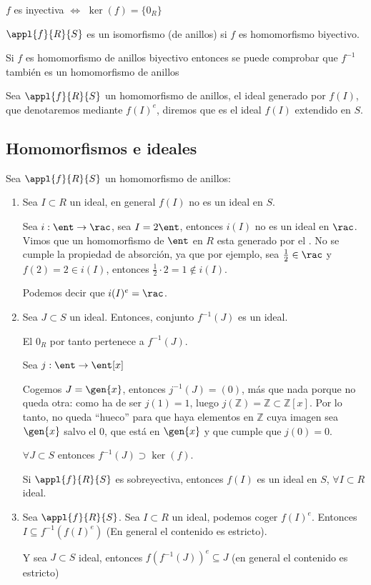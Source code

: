 \begin{prop}
	$f$ es inyectiva $\Leftrightarrow$ $\ker (f)=\{0_R \}$
\end{prop}

\begin{defn}
	$\appl{f}{R}{S}$ es un isomorfismo (de anillos) si $f$ es homomorfismo biyectivo.
\end{defn}

\begin{prop}
	Si $f$ es homomorfismo de anillos biyectivo entonces se puede comprobar que $f^{-1}$ también es un homomorfismo de anillos
\end{prop}

\begin{defn}
	Sea $\appl{f}{R}{S}$ un homomorfismo de anillos, el ideal generado por $f(I)$, que denotaremos mediante $f(I)^e$, diremos que es el ideal $f(I)$ extendido en $S$.
\end{defn}

\subsection{Homomorfismos e ideales}
Sea $\appl{f}{R}{S}$ un homomorfismo de anillos:
\begin{enumerate}
	\item Sea $I \subset R$ un ideal, en general $f(I)$ no es un ideal en $S$.
	\begin{example}
		Sea $i:\ent \rightarrow \rac$, sea $I=2\ent$, entonces $i(I)$ no es un ideal en $\rac$. Vimos que un homomorfismo de $\ent$ en $R$ esta generado por el \one. No se cumple la propiedad de absorción, ya que por ejemplo, sea $\frac{1}{2} \in \rac$ y $f(2)=2 \in i(I)$, entonces $\frac{1}{2}\cdot2=1 \notin i(I)$.

		Podemos decir que $i(I)^e=\rac$.
	\end{example}
	\item Sea $J \subset S$ un ideal. Entonces, conjunto $f^{-1}(J)$ es un ideal.

	El $0_R$ por tanto pertenece a $f^{-1}(J)$.
	\begin{example}
		Sea $j: \ent \rightarrow \ent[x]$

		Cogemos $J=\gen{x}$, entonces $j^{-1}(J)=(0)$, más que nada porque no queda otra: como ha de ser $j(1) = 1$, luego $j(ℤ) = ℤ ⊂ ℤ[x]$. Por lo tanto, no queda ``hueco'' para que haya elementos en $ℤ$ cuya imagen sea $\gen{x}$ salvo el $0$, que está en $\gen{x}$ y que cumple que $j(0) = 0$.
	\end{example}
	\obs $\forall J \subset S$ entonces $f^{-1}(J)\supset \ker(f)$.
	\begin{prop}
		Si $\appl{f}{R}{S}$ es sobreyectiva, entonces $f(I)$ es un ideal en $S$, $\forall I \subset R$ ideal.
	\end{prop}
	\item Sea $\appl{f}{R}{S}$. Sea $I \subset R$ un ideal, podemos coger $f(I)^e$. Entonces $I\subseteq f^{-1}(f(I)^e)$ (En general el contenido es estricto).

	Y sea $J \subset S$ ideal, entonces $f(f^{-1}(J))^e \subseteq J$ (en general el contenido es estricto)
\end{enumerate}

